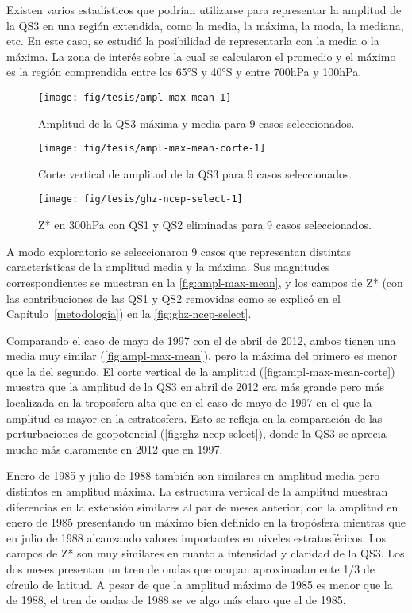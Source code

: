 \documentclass[spanish,a4paper,12pt]{book}
\begin{document}
Existen varios estadísticos que podrían utilizarse para representar la
amplitud de la QS3 en una región extendida, como la media, la máxima, la
moda, la mediana, etc. En este caso, se estudió la posibilidad de
representarla con la media o la máxima. La zona de interés sobre la cual
se calcularon el promedio y el máximo es la región comprendida entre los
65°S y 40°S y entre 700hPa y 100hPa.

\begin{figure*}
\texttt{[image: fig/tesis/ampl-max-mean-1]} \caption{Amplitud de la QS3 máxima y media para 9 casos seleccionados.}\label{fig:ampl-max-mean}
\end{figure*}

\begin{figure*}
\texttt{[image: fig/tesis/ampl-max-mean-corte-1]} \caption{Corte vertical de amplitud de la QS3 para 9 casos seleccionados.}\label{fig:ampl-max-mean-corte}
\end{figure*}

\begin{figure*}
\texttt{[image: fig/tesis/ghz-ncep-select-1]} \caption{Z* en 300hPa con QS1 y QS2 eliminadas para 9 casos seleccionados.}\label{fig:ghz-ncep-select}
\end{figure*}

A modo exploratorio se seleccionaron 9 casos que representan distintas
características de la amplitud media y la máxima. Sus magnitudes
correspondientes se muestran en la \autoref{fig:ampl-max-mean}, y los
campos de Z* (con las contribuciones de las QS1 y QS2 removidas como se
explicó en el Capítulo~\ref{metodologia}) en la
\autoref{fig:ghz-ncep-select}.

Comparando el caso de mayo de 1997 con el de abril de 2012, ambos tienen
una media muy similar (\autoref{fig:ampl-max-mean}), pero la máxima del
primero es menor que la del segundo. El corte vertical de la amplitud
(\autoref{fig:ampl-max-mean-corte}) muestra que la amplitud de la QS3 en
abril de 2012 era más grande pero más localizada en la troposfera alta
que en el caso de mayo de 1997 en el que la amplitud es mayor en la
estratosfera. Esto se refleja en la comparación de las perturbaciones de
geopotencial (\autoref{fig:ghz-ncep-select}), donde la QS3 se aprecia
mucho más claramente en 2012 que en 1997.

Enero de 1985 y julio de 1988 también son similares en amplitud media
pero distintos en amplitud máxima. La estructura vertical de la amplitud
muestran diferencias en la extensión similares al par de meses anterior,
con la amplitud en enero de 1985 presentando un máximo bien definido en
la tropósfera mientras que en julio de 1988 alcanzando valores
importantes en niveles estratosféricos. Los campos de Z* son muy
similares en cuanto a intensidad y claridad de la QS3. Los dos meses
presentan un tren de ondas que ocupan aproximadamente 1/3 de círculo de
latitud. A pesar de que la amplitud máxima de 1985 es menor que la de
1988, el tren de ondas de 1988 se ve algo más claro que el de 1985.
\end{document}
